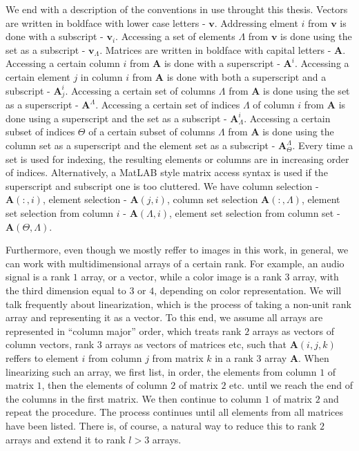 \documentclass[12pt,a4paper,oneside,english]{UPBThesis}
\begin{document}
We end with a description of the conventions in use throught this thesis. Vectors are written in boldface with lower case letters - $\textbf{v}$. Addressing elment $i$ from $\textbf{v}$ is done with a subscript - $\textbf{v}_i$. Accessing a set of elements $\Lambda$ from $\textbf{v}$ is done using the set as a subscript - $\textbf{v}_\Lambda$. Matrices are written in boldface with capital letters - $\textbf{A}$. Accessing a certain column $i$ from $\textbf{A}$ is done with a superscript - $\textbf{A}^i$. Accessing a certain element $j$ in column $i$ from $\textbf{A}$ is done with both a superscript and a subscript - $\textbf{A}^i_j$. Accessing a certain set of columns $\Lambda$ from $\textbf{A}$ is done using the set as a superscript - $\textbf{A}^\Lambda$. Accessing a certain set of indices $\Lambda$ of column $i$ from $\textbf{A}$ is done using a superscript and the set as a subscript - $\textbf{A}^i_\Lambda$. Accessing a certain subset of indices $\Theta$ of a certain subset of columns $\Lambda$ from $\textbf{A}$ is done using the column set as a superscript and the element set as a subscript - $\textbf{A}^\Lambda_\Theta$. Every time a set is used for indexing, the resulting elements or columns are in increasing order of indices. Alternatively, a MatLAB style matrix access syntax is used if the superscript and subscript one is too cluttered. We have column selection - $\textbf{A}(:,i)$, element selection - $\textbf{A}(j,i)$, column set selection $\textbf{A}(:,\Lambda)$, element set selection from column $i$ - $\textbf{A}(\Lambda,i)$, element set selection from column set - $\textbf{A}(\Theta,\Lambda)$.

Furthermore, even though we mostly reffer to images in this work, in general, we can work with multidimensional arrays of a certain rank. For example, an audio signal is a rank $1$ array, or a vector, while a color image is a rank $3$ array, with the third dimension equal to $3$ or $4$, depending on color representation. We will talk frequently about linearization, which is the process of taking a non-unit rank array and representing it as a vector. To this end, we assume all arrays are represented in ``column major'' order, which treats rank $2$ arrays as vectors of column vectors, rank $3$ arrays as vectors of matrices etc, such that $\textbf{A}(i,j,k)$ reffers to element $i$ from column $j$ from matrix $k$ in a rank $3$ array $\textbf{A}$. When linearizing such an array, we first list, in order, the elements from column $1$ of matrix $1$, then the elements of column $2$ of matrix $2$ etc. until we reach the end of the columns in the first matrix. We then continue to column $1$ of matrix $2$ and repeat the procedure. The process continues until all elements from all matrices have been listed. There is, of course, a natural way to reduce this to rank $2$ arrays and extend it to rank $l > 3$ arrays.
\end{document}
